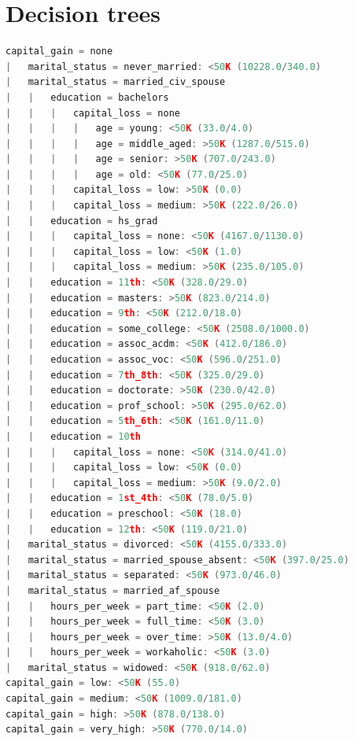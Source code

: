 \documentclass[a4paper]{llncs}
\begin{document}
\clearpage
\section{Decision trees}

\begin{lstlisting}[language=c,frame=single,breaklines=true,basicstyle=\footnotesize\ttfamily,caption={Decision tree built by C4.5 with -C 0.05},label=decision_tree_c45]
capital_gain = none
|   marital_status = never_married: <50K (10228.0/340.0)
|   marital_status = married_civ_spouse
|   |   education = bachelors
|   |   |   capital_loss = none
|   |   |   |   age = young: <50K (33.0/4.0)
|   |   |   |   age = middle_aged: >50K (1287.0/515.0)
|   |   |   |   age = senior: >50K (707.0/243.0)
|   |   |   |   age = old: <50K (77.0/25.0)
|   |   |   capital_loss = low: >50K (0.0)
|   |   |   capital_loss = medium: >50K (222.0/26.0)
|   |   education = hs_grad
|   |   |   capital_loss = none: <50K (4167.0/1130.0)
|   |   |   capital_loss = low: <50K (1.0)
|   |   |   capital_loss = medium: >50K (235.0/105.0)
|   |   education = 11th: <50K (328.0/29.0)
|   |   education = masters: >50K (823.0/214.0)
|   |   education = 9th: <50K (212.0/18.0)
|   |   education = some_college: <50K (2508.0/1000.0)
|   |   education = assoc_acdm: <50K (412.0/186.0)
|   |   education = assoc_voc: <50K (596.0/251.0)
|   |   education = 7th_8th: <50K (325.0/29.0)
|   |   education = doctorate: >50K (230.0/42.0)
|   |   education = prof_school: >50K (295.0/62.0)
|   |   education = 5th_6th: <50K (161.0/11.0)
|   |   education = 10th
|   |   |   capital_loss = none: <50K (314.0/41.0)
|   |   |   capital_loss = low: <50K (0.0)
|   |   |   capital_loss = medium: >50K (9.0/2.0)
|   |   education = 1st_4th: <50K (78.0/5.0)
|   |   education = preschool: <50K (18.0)
|   |   education = 12th: <50K (119.0/21.0)
|   marital_status = divorced: <50K (4155.0/333.0)
|   marital_status = married_spouse_absent: <50K (397.0/25.0)
|   marital_status = separated: <50K (973.0/46.0)
|   marital_status = married_af_spouse
|   |   hours_per_week = part_time: <50K (2.0)
|   |   hours_per_week = full_time: <50K (3.0)
|   |   hours_per_week = over_time: >50K (13.0/4.0)
|   |   hours_per_week = workaholic: <50K (3.0)
|   marital_status = widowed: <50K (918.0/62.0)
capital_gain = low: <50K (55.0)
capital_gain = medium: <50K (1009.0/181.0)
capital_gain = high: >50K (878.0/138.0)
capital_gain = very_high: >50K (770.0/14.0)
\end{lstlisting}
\end{document}
